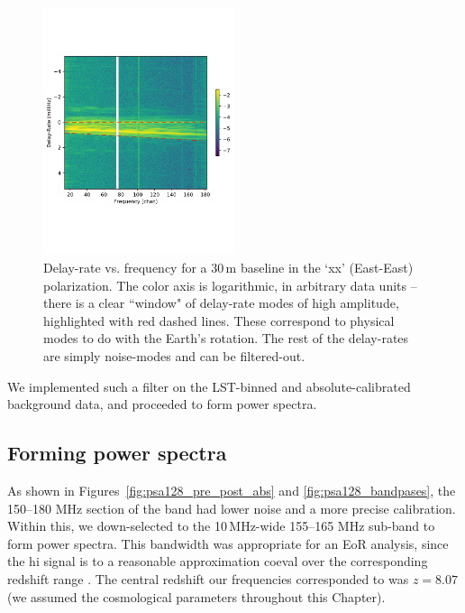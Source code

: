 \begin{figure}
\centering
\includegraphics[width=0.5\textwidth]{chapters/psa128_pol/figures/fringerate_example.pdf}
\caption[Delay-rate vs. frequency for a 30\,m baseline in the `xx' (East-East) polarization.]{Delay-rate vs. frequency for a 30\,m baseline in the `xx' (East-East) polarization. The color axis is logarithmic, in arbitrary data units -- there is a clear ``window" of delay-rate modes of high amplitude, highlighted with red dashed lines. These correspond to physical modes to do with the Earth's rotation. The rest of the delay-rates are simply noise-modes and can be filtered-out.}
\label{fig:fringerate_example}
\end{figure}

We implemented such a filter on the LST-binned and absolute-calibrated background data, and proceeded to form power spectra.

\subsection{Forming power spectra}

As shown in Figures~\ref{fig:psa128_pre_post_abs} and \ref{fig:psa128_bandpases}, the 150--180 MHz section of the band had lower noise and a more precise calibration. Within this, we down-selected to the 10\,MHz-wide 155--165 MHz sub-band to form power spectra. This bandwidth was appropriate for an EoR analysis, since the {\sc hi} signal is to a reasonable approximation coeval over the corresponding redshift range \citep{Furlanetto.06}. The central redshift our frequencies corresponded to was $z=8.07$ (we assumed the \cite{Planck.16} cosmological parameters throughout this Chapter).

